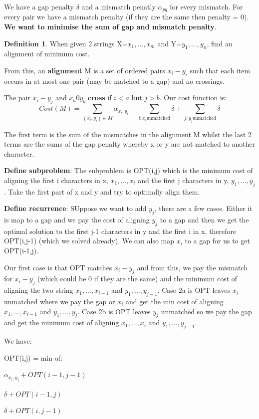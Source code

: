 \documentclass[11pt, oneside]{article}
\theoremstyle{definition}
\newtheorem{definition}{Definition}[section]
\begin{document}
We have a gap penalty $\delta$ and a mismatch penatly $\alpha_{pq}$ for every mismatch. For every pair we have a mismatch penalty (if they are the same then penalty = 0). \textbf{We want to minimise the sum of gap and mismatch penalty}.

\begin{definition}
  When given 2 strings X=$x_1,...,x_m$ and Y=$y_1,...,y_n$, find an alignment of minimum cost.
\end{definition}
From this, an \textbf{alignment} M is a set of ordered pairs $x_i-y_i$ such that each item occurs in at most one pair (may be matched to a gap) and no crossings.

The pair $x_i-y_j$ and $x_a0y_b$ \textbf{cross} if $i < a$ but $j > b$. Our cost function is:
$$
Cost(M) = \sum\limits_{(x_i,y_i) \in M}\alpha_{x_i,y_i} + \sum\limits_{i:x_i \text{unmatched}}\delta + \sum\limits_{j:y_j \text{unmatched}}\delta
$$

The first term is the sum of the mismatches in the alignment M whilst the last 2 terms are the sums of the gap penalty whereby x or y are not matched to another character.

\textbf{Define subproblem}: The subproblem is OPT(i,j) which is the minimum cost of aligning the first i characters in x, $x_1,...,x_i$ and the first j characters in y, $y_1,...,y_j$. Take the first part of x and y and try to optimally align them.

\textbf{Define recurrence}: SUppose we want to add $y_j$, there are a few cases. Either it is map to a gap and we pay the cost of aligning $y_j$ to a gap and then we get the optimal solution to the first j-1 characters in y and the first i in x, therefore OPT(i,j-1) (which we solved already). We can also map $x_i$ to a gap for us to get OPT(i-1,j).

Our first case is that OPT matches $x_i - y_j$ and from this, we pay the mismatch for $x_i - y_j$ (which could be 0 if they are the same) and the minimum cost of aligning the two string $x_1,...,x_{i-1}$ and $y_1,...,y_{j-1}$. Case 2a is OPT leaves $x_i$ unmatched where we pay the gap or $x_i$ and get the min cost of aligning $x_1,...,x_{i-1}$ and $y_1,...,y_j$. Case 2b is OPT leaves $y_j$ unmatched so we pay the gap and get the minimum cost of aligning $x_1,...,x_i$ and $y_1,...,y_{j-1}$.

We have:
\begin{center}
  OPT(i,j) = min of:

  $\alpha_{x_i,y_j} + OPT(i-1,j-1)$

  $\delta + OPT(i-1,j)$

  $\delta + OPT(i,j-1)$
\end{center}
\end{document}
